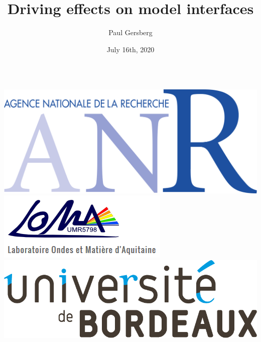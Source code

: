 \documentclass[9pt, dvipsnames,aspectratio=169]{beamer} %
\date{July 16th, 2020}
\author{Paul Gersberg}
\title{Driving effects on model interfaces}
\begin{document}
    \everymath{\displaystyle}

\begin{frame}
	\begin{columns}
    \includegraphics[width=\linewidth]{anr.png}\\ \vspace{0.5cm}
    \includegraphics[width=\linewidth]{loma.png}\\  \vspace{0.5cm}      
    \includegraphics[width=\linewidth]{u-bordeaux.png} \vspace{0.5cm}    

\end{columns}
\end{frame}
\end{document}
